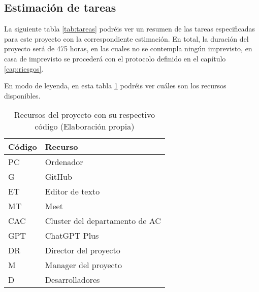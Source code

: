 \subsection{Estimación de tareas}
\label{sec:estimacion_tareas}


La siguiente tabla \ref{tab:tareas} podréis ver un resumen de las tareas especificadas para este proyecto con la correspondiente estimación. En total,
la duración del proyecto será de 475 horas, en las cuales no se contempla ningún imprevisto, en casa de imprevisto se procederá con el protocolo definido
en el capítulo \ref{cap:riesgos}.

En modo de leyenda, en esta tabla \ref{tab:recursos} podréis ver cuáles son los recursos disponibles.

\begin{table}[H]
    \centering
    \begin{tabular}{|l|l|}
    \hline
    \rowcolor[HTML]{8EA9D8} 
    Código & Recurso                        \\ \hline
    PC     & Ordenador                      \\ \hline
    G      & GitHub                         \\ \hline
    ET     & Editor de texto                \\ \hline
    MT     & Meet                           \\ \hline
    CAC    & Cluster del departamento de AC \\ \hline
    GPT    & ChatGPT Plus                   \\ \hline
    DR     & Director del proyecto          \\ \hline
    M      & Manager del proyecto           \\ \hline
    D      & Desarrolladores                \\ \hline
    \end{tabular}
    \caption[Recursos del proyecto con su respectivo código]{Recursos del proyecto con su respectivo código (Elaboración propia)}
    \label{tab:recursos}
\end{table}

